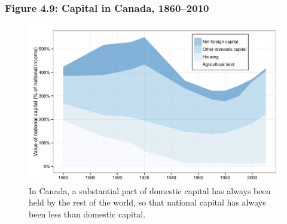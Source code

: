 \documentclass[t]{beamer}\usepackage[]{graphicx}\usepackage[]{color}
\newenvironment{knitrout}{}{} %
\begin{document}
\begin{frame}[label=Figure_4_9]
\frametitle{Figure 4.9: Capital in Canada, 1860--2010}
\begin{figure}[t]
\begin{minipage}[b]{\textwidth}
\centering
\begin{knitrout}\footnotesize
{}\color{fgcolor}

{\centering \includegraphics[width=1\linewidth]{figures/color/Figure_4_9} 

}



\end{knitrout}
\caption{In Canada, a substantial part of domestic capital has always been held by the rest of the world, so that national capital has always been less than domestic capital.}
\end{minipage}
\end{figure}
\end{frame}
\end{document}
